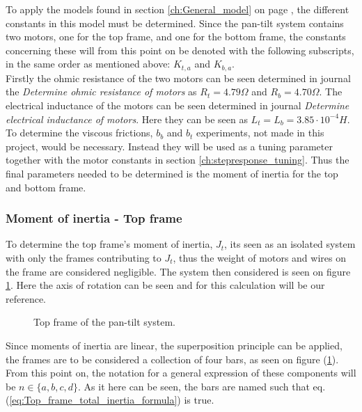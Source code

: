 \documentclass[../../main]{subfiles}
\begin{document}
To apply the models found in section \ref{ch:General_model} on page \pageref{ch:General_model}, the different constants in this model must be determined. Since the pan-tilt system contains two motors, one for the top frame, and one for the bottom frame, the constants concerning these will from this point on be denoted with the following subscripts, in the same order as mentioned above: $K_{t,a}$ and $K_{b,a}$.\\
Firstly the ohmic resistance of the two motors can be seen determined in journal the \textit{Determine ohmic resistance of motors} as $R_t = 4.79 \si{\Omega}$ and $R_b = 4.70 \si{\Omega}$. The electrical inductance of the motors can be seen determined in journal \textit{Determine electrical inductance of motors}. Here they can be seen as $L_t = L_b = 3.85\cdot 10^{-4} \si{H}$.\\
To determine the viscous frictions, $b_b$ and $b_t$ experiments, not made in this project, would be necessary. Instead they will be used as a tuning parameter together with the motor constants in section \ref{ch:stepresponse_tuning}. Thus the final parameters needed to be determined is the moment of inertia for the top and bottom frame.

\subsubsection{Moment of inertia - Top frame}
\label{ch:Top_frame_inertia}
To determine the top frame's moment of inertia, $J_{t}$, its seen as an isolated system with only the frames contributing to $J_{t}$, thus the weight of motors and wires on the frame are considered negligible. The system then considered is seen on figure \ref{fig:TopFrame}. Here the axis of rotation can be seen and for this calculation will be our reference.\\

\begin{figure}[H]
  \centering
  
  \caption{Top frame of the pan-tilt system.}
  \label{fig:TopFrame}
\end{figure}

Since moments of inertia are linear, the superposition principle can be applied, the frames are to be considered a collection of four bars, as seen on figure (\ref{fig:TopFrame}). From this point on, the notation for a general expression of these components will be $n \in \{a,b,c,d\}$. As it here can be seen, the bars are named such that eq. (\ref{eq:Top_frame_total_inertia_formula}) is true.
\end{document}

